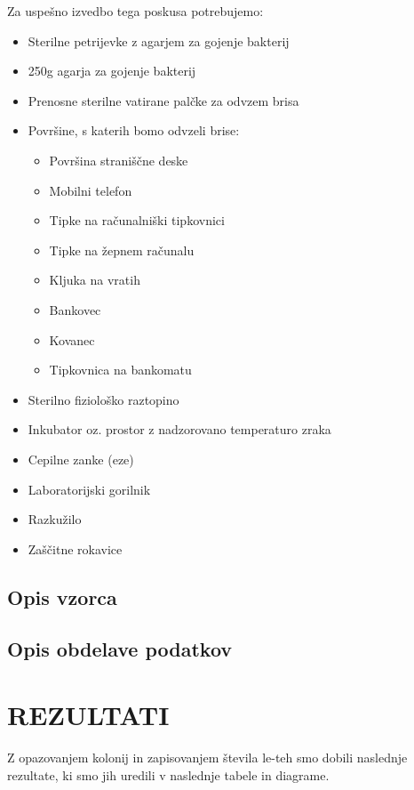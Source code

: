 \documentclass[12pt, a4paper, oneside]{report}
\begin{document}
Za uspešno izvedbo tega poskusa potrebujemo:
\begin{itemize}
  \item Sterilne petrijevke z agarjem za gojenje bakterij
  \item 250g agarja za gojenje bakterij
  \item Prenosne sterilne vatirane palčke za odvzem brisa
  \item Površine, s katerih bomo odvzeli brise:
  \begin{itemize}
    \item Površina straniščne deske
    \item Mobilni telefon
    \item Tipke na računalniški tipkovnici
    \item Tipke na žepnem računalu
    \item Kljuka na vratih
    \item Bankovec
    \item Kovanec
    \item Tipkovnica na bankomatu
  \end{itemize}
  \item Sterilno fiziološko raztopino
  \item Inkubator oz. prostor z nadzorovano temperaturo zraka
  \item Cepilne zanke (eze)
  \item Laboratorijski gorilnik
  \item Razkužilo
  \item Zaščitne rokavice

\end{itemize}

\subsection{Opis vzorca}

\subsection{Opis obdelave podatkov}

\section{REZULTATI}

Z opazovanjem kolonij in zapisovanjem števila le-teh smo dobili naslednje rezultate, ki smo jih uredili v naslednje tabele in diagrame.
\end{document}
